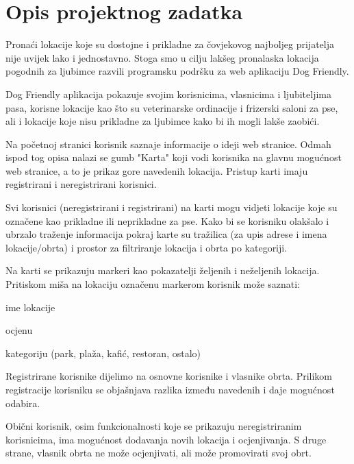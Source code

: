 \chapter{Opis projektnog zadatka}
		
		
		Pronaći lokacije koje su dostojne i prikladne za čovjekovog najboljeg prijatelja nije uvijek lako i jednostavno. Stoga smo u cilju lakšeg pronalaska lokacija pogodnih za ljubimce razvili programsku podršku za web aplikaciju Dog Friendly.
  
		Dog Friendly aplikacija pokazuje svojim korisnicima, vlasnicima i ljubiteljima pasa, korisne lokacije kao što su veterinarske ordinacije i frizerski saloni za pse, ali i lokacije koje nisu prikladne za ljubimce kako bi ih mogli lakše zaobići.
		\newline
		
		Na početnoj stranici korisnik saznaje informacije o ideji web stranice. Odmah ispod tog opisa nalazi se gumb "Karta" koji vodi korisnika na glavnu mogućnost web stranice, a to je prikaz gore navedenih lokacija. Pristup karti imaju registrirani i neregistrirani korisnici. \newline
		
		Svi korisnici (neregistrirani i registrirani) na karti mogu vidjeti lokacije koje su označene kao prikladne ili neprikladne za pse. Kako bi se korisniku olakšalo i ubrzalo traženje informacija pokraj karte su tražilica (za upis adrese i imena lokacije/obrta) i prostor za filtriranje lokacija i obrta po kategoriji.\newline
  
		Na karti se prikazuju markeri kao pokazatelji željenih i neželjenih lokacija. Pritiskom miša na lokaciju označenu markerom korisnik može saznati:
		
		\begin{packed_item}
			\item {ime lokacije}
			\item {ocjenu}
			\item {kategoriju (park, plaža, kafić, restoran, ostalo)}
		\end{packed_item}
		\newline
		
		Registrirane korisnike dijelimo na osnovne korisnike i vlasnike obrta. Prilikom registracije korisniku se objašnjava razlika između navedenih i daje mogućnost odabira.
  
        Obični korisnik, osim funkcionalnosti koje se prikazuju neregistriranim korisnicima, ima mogućnost dodavanja novih lokacija i ocjenjivanja. S druge strane, vlasnik obrta ne može ocjenjivati, ali može promovirati svoj obrt.
		\newline
		
